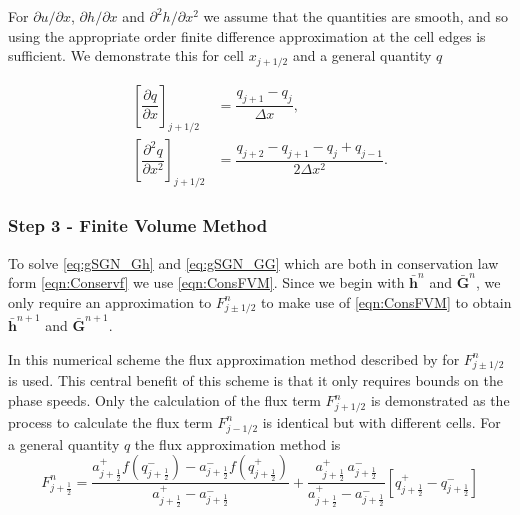 \documentclass[10pt]{elsarticle}
\newcommand{\vecn}[1]{\boldsymbol{#1}}
\begin{document}
For $\partial u / \partial x$, $\partial h / \partial x$ and $\partial^2 h / \partial x^2$ we assume that the quantities are smooth, and so using the appropriate order finite difference approximation at the cell edges is sufficient. We demonstrate this for cell $x_{j+1/2}$ and a general quantity $q$

\begin{align*}
\left[\dfrac{\partial q}{\partial x} \right]_{j+1/2} &= \dfrac{q_{j+1} - q_j}{\Delta x}, \\
\left[\dfrac{\partial^2 q}{\partial x^2} \right]_{j+1/2} &=  \dfrac{q_{j+2} - q_{j+1} - q_j + q_{j-1}}{2 \Delta x^2} .
\end{align*}


\subsubsection{Step 3 - Finite Volume Method}
To solve \eqref{eq:gSGN_Gh} and \eqref{eq:gSGN_GG} which are both in conservation law form \eqref{eqn:Conservf} we use \eqref{eqn:ConsFVM}. Since we begin with $\bar{\vecn{h}}^n$ and $\bar{\vecn{G}}^n$, we only require an approximation to $F^n_{j\pm1/2}$ to make use of \eqref{eqn:ConsFVM} to obtain $\bar{\vecn{h}}^{n+1}$ and $\bar{\vecn{G}}^{n+1}$.

In this numerical scheme the flux approximation method described by  \citet{Kurganov-etal-2001-707} for $F^n_{j\pm1/2}$ is used. This central benefit of this scheme is that it only requires bounds on the phase speeds. Only the calculation of the flux term $F^n_{j+1/2}$ is demonstrated as the process to calculate the flux term $F^n_{j-1/2}$ is identical but with different cells. For a general quantity $q$ the flux approximation method \cite{Kurganov-etal-2001-707} is
\begin{equation}\label{eqn:HLL_flux}
F^n_{j+\frac{1}{2}} = \dfrac{a^+_{j+\frac{1}{2}} f\left(q^-_{j+\frac{1}{2}}\right) - a^-_{j+\frac{1}{2}} f\left(q^+_{j+\frac{1}{2}}\right)}{a^+_{j+\frac{1}{2}} - a^-_{j+\frac{1}{2}}}  + \dfrac{a^+_{j+\frac{1}{2}} \, a^-_{j+\frac{1}{2}}}{a^+_{j+\frac{1}{2}} - a^-_{j+\frac{1}{2}}} \left [ q^+_{j+\frac{1}{2}} - q^-_{j+\frac{1}{2}} \right ]
\end{equation}
\end{document}
